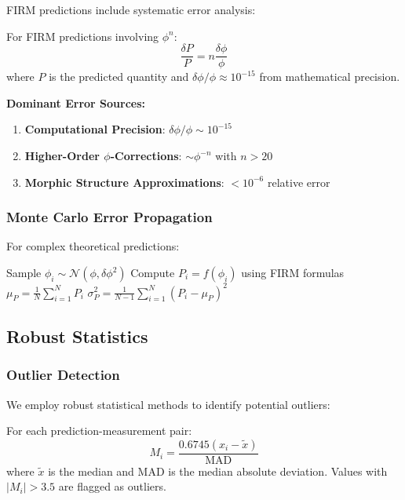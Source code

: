 FIRM predictions include systematic error analysis:

\begin{theorem}
For FIRM predictions involving $\phi^n$:
\begin{equation}
\frac{\delta P}{P} = n \frac{\delta \phi}{\phi}
\end{equation}
where $P$ is the predicted quantity and $\delta \phi/\phi \approx 10^{-15}$ from mathematical precision.
\end{theorem}

\textbf{Dominant Error Sources:}
\begin{enumerate}
\item \textbf{Computational Precision}: $\delta \phi/\phi \sim 10^{-15}$
\item \textbf{Higher-Order $\phi$-Corrections}: $\sim \phi^{-n}$ with $n > 20$
\item \textbf{Morphic Structure Approximations}: $< 10^{-6}$ relative error
\end{enumerate}

\subsubsection{Monte Carlo Error Propagation}

For complex theoretical predictions:
\begin{algorithm}[H]
\begin{algorithmic}
    \State Sample $\phi_i \sim \mathcal{N}(\phi, \delta\phi^2)$
    \State Compute $P_i = f(\phi_i)$ using FIRM formulas
\EndFor
\State $\mu_P = \frac{1}{N}\sum_{i=1}^N P_i$
\State $\sigma_P^2 = \frac{1}{N-1}\sum_{i=1}^N (P_i - \mu_P)^2$
\end{algorithmic}
\end{algorithm}

\subsection{Robust Statistics}

\subsubsection{Outlier Detection}

We employ robust statistical methods to identify potential outliers:

\begin{definition}
For each prediction-measurement pair:
\begin{equation}
M_i = \frac{0.6745(x_i - \tilde{x})}{\text{MAD}}
\end{equation}
where $\tilde{x}$ is the median and MAD is the median absolute deviation. Values with $|M_i| > 3.5$ are flagged as outliers.
\end{definition}

